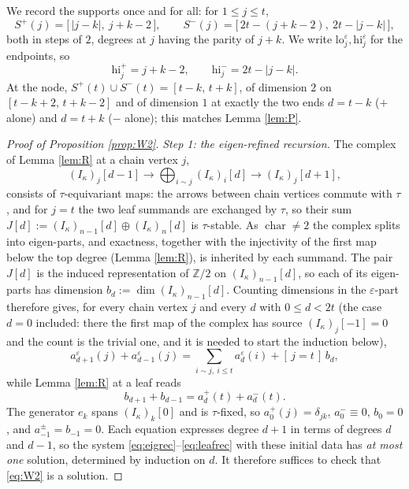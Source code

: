 \documentclass[reqno]{amsart}
\theoremstyle{plain}
\theoremstyle{definition}
\newcommand{\ka}{\kappa}
\newcommand{\eps}{\varepsilon}
\newcommand{\hi}{\mathrm{hi}}
\newcommand{\lo}{\mathrm{lo}}
\begin{document}
We record the supports once and for all: for $1\le j\le t$,
\begin{equation}\label{eq:supports}
   S^{+}(j)=\bigl[\,|j-k|,\ j+k-2\,\bigr],
   \qquad
   S^{-}(j)=\bigl[\,2t-(j+k-2),\ 2t-|j-k|\,\bigr],
\end{equation}
both in steps of $2$, degrees at $j$ having the parity of $j+k$.  We write
$\lo^{\eps}_j,\hi^{\eps}_j$ for the endpoints, so
\[
   \hi^{+}_j=j+k-2,\qquad \hi^{-}_j=2t-|j-k| .
\]
At the node, $S^{+}(t)\cup S^{-}(t)=[t-k,\,t+k]$, of dimension $2$ on
$[t-k+2,\,t+k-2]$ and of dimension $1$ at exactly the two ends $d=t-k$ ($+$
alone) and $d=t+k$ ($-$ alone); this matches Lemma \ref{lem:P}.

\begin{proof}[Proof of Proposition \ref{prop:W2}]
\emph{Step 1: the eigen-refined recursion.}  The complex of Lemma \ref{lem:R}
at a chain vertex $j$,
\[
   (I_\ka)_j[d-1]\longrightarrow\bigoplus_{i\sim j}(I_\ka)_i[d]
   \longrightarrow (I_\ka)_j[d+1],
\]
consists of $\tau$-equivariant maps: the arrows between chain vertices commute
with $\tau$, and for $j=t$ the two leaf summands are exchanged by $\tau$, so
their sum $J[d]:=(I_\ka)_{n-1}[d]\oplus(I_\ka)_n[d]$ is $\tau$-stable.  As
$\operatorname{char}\ne2$ the complex splits into eigen-parts, and exactness,
together with the injectivity of the first map below the top degree (Lemma
\ref{lem:R}), is inherited by each summand.  The pair $J[d]$ is the induced
representation of $\mathbb{Z}/2$ on $(I_\ka)_{n-1}[d]$, so each of its
eigen-parts has dimension $b_d:=\dim(I_\ka)_{n-1}[d]$.  Counting dimensions in
the $\eps$-part therefore gives, for every chain vertex $j$ and every $d$ with
$0\le d<2t$ \textup{(}the case $d=0$ included: there the first map of the
complex has source $(I_\ka)_j[-1]=0$ and the count is the trivial one, and it
is needed to start the induction below\textup{)},
\begin{equation}\label{eq:eigrec}
   a^{\eps}_{d+1}(j)+a^{\eps}_{d-1}(j)
   =\sum_{i\sim j,\ i\le t}a^{\eps}_d(i)+[\,j=t\,]\,b_d ,
\end{equation}
while Lemma \ref{lem:R} at a leaf reads
\begin{equation}\label{eq:leafrec}
   b_{d+1}+b_{d-1}=a^{+}_d(t)+a^{-}_d(t).
\end{equation}
The generator $e_k$ spans $(I_\ka)_k[0]$ and is $\tau$-fixed, so
$a^{+}_0(j)=\delta_{jk}$, $a^{-}_0\equiv0$, $b_0=0$, and
$a^{\pm}_{-1}=b_{-1}=0$.  Each equation expresses degree $d+1$ in terms of
degrees $d$ and $d-1$, so the system \eqref{eq:eigrec}--\eqref{eq:leafrec} with
these initial data has \emph{at most one} solution, determined by induction on
$d$.  It therefore suffices to check that \eqref{eq:W2} is a solution.


\end{proof}
\end{document}
